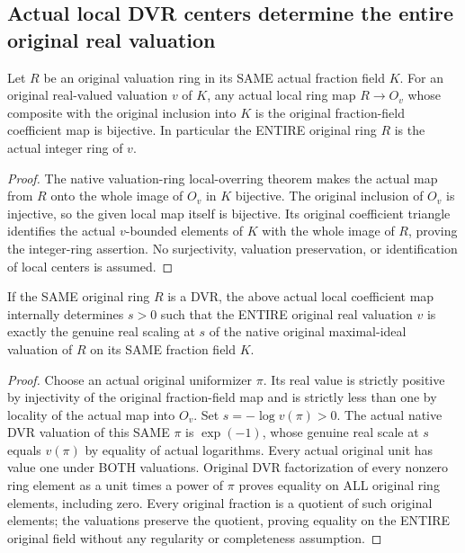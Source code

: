 \subsection{Actual local DVR centers determine the entire original real valuation}

\begin{lemma}
\label{lem:actual-local-valuation-overring}
\leanok
Let $R$ be an original valuation ring in its SAME actual fraction field $K$.
For an original real-valued valuation $v$ of $K$, any actual local ring map
$R\to O_v$ whose composite with the original inclusion into $K$ is the
original fraction-field coefficient map is bijective. In particular the
ENTIRE original ring $R$ is the actual integer ring of $v$.
\end{lemma}
\begin{proof}
The native valuation-ring local-overring theorem makes the actual map from
$R$ onto the whole image of $O_v$ in $K$ bijective. The original inclusion of
$O_v$ is injective, so the given local map itself is bijective. Its original
coefficient triangle identifies the actual $v$-bounded elements of $K$ with
the whole image of $R$, proving the integer-ring assertion. No surjectivity,
valuation preservation, or identification of local centers is assumed.
\end{proof}

\begin{lemma}
\label{lem:actual-local-dvr-real-scale}
\leanok
If the SAME original ring $R$ is a DVR, the above actual local coefficient
map internally determines $s>0$ such that the ENTIRE original real valuation
$v$ is exactly the genuine real scaling at $s$ of the native original
maximal-ideal valuation of $R$ on its SAME fraction field $K$.
\end{lemma}
\begin{proof}
Choose an actual original uniformizer $\pi$. Its real value is strictly
positive by injectivity of the original fraction-field map and is strictly
less than one by locality of the actual map into $O_v$. Set
$s=-\log v(\pi)>0$. The actual native DVR valuation of this SAME $\pi$ is
$\exp(-1)$, whose genuine real scale at $s$ equals $v(\pi)$ by equality of
actual logarithms. Every actual original unit has value one under BOTH
valuations. Original DVR factorization of every nonzero ring element as a
unit times a power of $\pi$ proves equality on ALL original ring elements,
including zero. Every original fraction is a quotient of such original
elements; the valuations preserve the quotient, proving equality on the
ENTIRE original field without any regularity or completeness assumption.
\end{proof}

